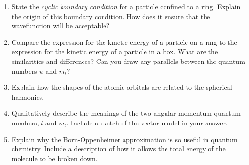 \documentclass{memoir}[11pt,oneside,a4paper,openany]
\begin{document}
\begin{enumerate}
	\item State the \emph{cyclic boundary condition} for a particle confined to a ring. Explain the origin of this boundary condition. How does it ensure that the wavefunction will be acceptable?
	\item Compare the expression for the kinetic energy of a particle on a ring to the expression for the kinetic energy of a particle in a box. What are the similarities and differences? Can you draw any parallels between the quantum numbers $n$ and $m_l$?
	\item Explain how the shapes of the atomic orbitals are related to the spherical harmonics.
	\item Qualitatively describe the meanings of the two angular momentum quantum numbers, $l$ and $m_l$. Include a sketch of the vector model in your answer. 
	\item Explain why the Born-Oppenheimer approximation is so useful in quantum chemistry. Include a description of how it allows the total energy of the molecule to be broken down. 
	


\end{enumerate}
\end{document}
